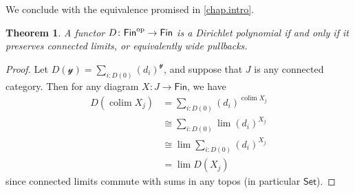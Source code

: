 \documentclass[11pt, article, one side]{memoir}
\theoremstyle{theorem}
\newtheorem{theorem}[section]{Theorem}
\theoremstyle{definition}
\theoremstyle{remark}
\DeclareMathOperator*{\colim}{colim}
\newcommand{\Cat}[1]{\mathsf{#1}}%
\newcommand{\op}{^\tn{op}}
\newcommand{\tn}[1]{\textnormal{#1}}
\newcommand{\smset}{\Cat{Set}}
\newcommand{\fin}{\Cat{Fin}}
\newcommand{\yon}{\mathcal{y}}
\begin{document}
We conclude with the equivalence promised in \cref{chap.intro}.

\begin{theorem}\label{thm.dir_equiv}
A functor $D\colon \fin\op \to \fin$ is a Dirichlet polynomial if and only if it preserves connected limits, or equivalently wide pullbacks.
\end{theorem}
\begin{proof}
Let $D(\yon)=\sum_{i:D(0)}(d_i)^\yon$, and suppose that $J$ is any connected category. Then for any diagram $X\colon J\to\fin$, we have
\begin{align*}
    D(\colim X_j) &= \sum_{i:D(0)} (d_i)^{\colim X_j} \\
    &\cong \sum_{i:D(0)} \lim (d_i)^{X_j} \\
    &\cong \lim \sum_{i:D(0)} (d_i)^{X_j} \\
    &= \lim D(X_j)
\end{align*}
since connected limits commute with sums in any topos (in particular $\smset$).


\end{proof}
\end{document}
